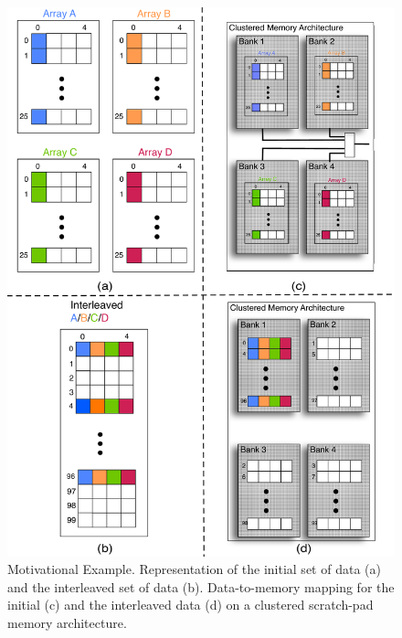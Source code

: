 \begin{figure}
\centering
	\includegraphics[width = 0.9\linewidth]{D/Images/motivation2.pdf}
	\caption{Motivational Example. Representation of the initial set of data (a) and the interleaved set of data (b). Data-to-memory mapping for the initial (c) and the interleaved data (d) on a clustered scratch-pad memory architecture.}	
	\label{fig:motivation}
\end{figure}

